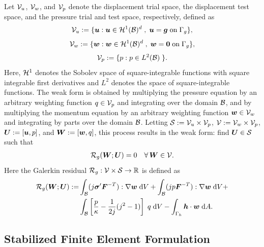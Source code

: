Let $\mathcal{V}_u$, $\mathcal{V}_w$, and $\mathcal{V}_p$ denote the displacement trial space,
the displacement test space, and the pressure trial and test space,
respectively, defined as
%
\begin{gather}
\mathcal{V}_u := \{ \boldsymbol{u} : \boldsymbol{u} \in \mathcal{H}^1(\mathcal{B})^d \; , \;
\boldsymbol{u} = \boldsymbol{g} \; \text{on} \; \Gamma_g \},
\label{eq:mech_disp_space_continuous}
\end{gather}
%
\begin{gather}
\mathcal{V}_w := \{ \boldsymbol{w} : \boldsymbol{w} \in \mathcal{H}^1(\mathcal{B})^d \; , \;
\boldsymbol{w} = \boldsymbol{0} \; \text{on} \; \Gamma_g \},
\label{eq:mech_weight_space_continuous}
\end{gather}
%
\begin{gather}
\mathcal{V}_p := \{ p : p \in L^2(\mathcal{B}) \; \}.
\label{eq:mech_pressure_space_continuous}
\end{gather}
%
Here, $\mathcal{H}^1$ denotes the Sobolev space of square-integrable functions
with square integrable first derivatives and $L^2$ denotes the space
of square-integrable functions. The weak form is obtained by multiplying
the pressure equation by an arbitrary weighting function $q \in \mathcal{V}_p$
and integrating over the domain $\mathcal{B}$, and by multiplying the momentum
equation by an arbitrary weighting function $\boldsymbol{w} \in \mathcal{V}_w$ and integrating
by parts over the domain $\mathcal{B}$. Letting $\mathcal{S} := \mathcal{V}_u \times \mathcal{V}_p$,
$\mathcal{V} := \mathcal{V}_w \times \mathcal{V}_p$, $\boldsymbol{U} := [\boldsymbol{u}, p]$, and $\boldsymbol{W} := [\boldsymbol{w}, q]$,
this process results in the weak form: find $\boldsymbol{U} \in \mathcal{S}$ such that
%
\begin{gather}
\mathcal{R}_g(\boldsymbol{W} ; \boldsymbol{U}) = 0 \quad \forall \, \boldsymbol{W} \in \mathcal{V}.
\label{eq:mech_weak_form}
\end{gather}
%
Here the Galerkin residual $\mathcal{R}_g : \mathcal{V} \times \mathcal{S} \to \mathbb{R}$ is
defined as
%
\begin{gather}
\begin{split}
\mathcal{R}_g(\boldsymbol{W} ; \boldsymbol{U}) :=
&\int_{\mathcal{B}} (j \boldsymbol{\sigma}' \boldsymbol{F}^{-T}) : \nabla \boldsymbol{w} \; \text{d} V
+ \int_{\mathcal{B}} (j p \boldsymbol{F}^{-T}) : \nabla \boldsymbol{w} \; \text{d} V + \\
& \int_{\mathcal{B}} \left[ \frac{p}{\kappa} - \frac{1}{2 j}(j^2 - 1) \right] \;
q \; \text{d} V
- \int_{\Gamma_h} \boldsymbol{h} \cdot \boldsymbol{w} \; \text{d} A.
\end{split}
\label{eq:mech_galerkin_resid}
\end{gather}

\subsection{Stabilized Finite Element Formulation}

